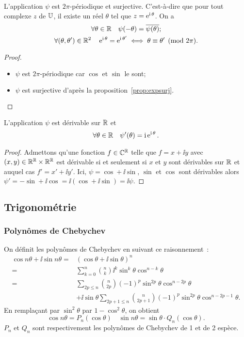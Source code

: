\begin{prop}
  L'application $\psi$ est  $2\pi$-périodique et surjective. C'est-à-dire que pour tout complexe $z$ de $\mathbb{U}$, il existe un réel $\theta$ tel que $z=\operatorname{e}^{\operatorname{i} \theta}$. On a
  \begin{gather}
    \forall \theta \in \mathbb{R} \quad \psi(-\theta)=\overline{\psi(\theta)};\\
    \forall (\theta, \theta') \in \mathbb{R}^2 \quad \operatorname{e}^{\operatorname{i} \theta}=\operatorname{e}^{\operatorname{i} \theta'} \iff \theta \equiv \theta' \pmod {2\pi}.
  \end{gather}
\end{prop}
\begin{proof}
  \begin{itemize}
  \item $\psi$ est $2\pi$-périodique car $\cos$ et $\sin$ le sont;
  \item $\psi$ est surjective d'après la proposition~\ref{prop:expsurj}.
  \end{itemize}
\end{proof}
%
\begin{prop}
  L'application $\psi$ est dérivable sur $\mathbb{R}$ et
  \begin{equation}
    \forall \theta \in \mathbb{R} \quad \psi'(\theta)=\operatorname{i} \operatorname{e}^{\operatorname{i} \theta}.
  \end{equation}
\end{prop}
\begin{proof}
  Admettons qu'une fonction $f \in \mathbb{C}^{\mathbb{R}}$ telle que $f=x+\ii y$ avec $(x,y) \in \mathbb{R}^{\mathbb{R}} \times \mathbb{R}^{\mathbb{R}}$ est dérivable si et seulement si $x$ et $y$ sont dérivables sur $\mathbb{R}$ et auquel cas $f'=x' +\ii y'$. Ici, $\psi=\cos +\ii \sin$, $\sin$ et $\cos$ sont dérivables alors $\psi'=-\sin + \ii \cos=\ii (\cos +\ii \sin)=\ii \psi$.
\end{proof}
%
\subsection{Trigonométrie}
\label{subsec:complexestrigo}
\subsubsection{Polynômes de Chebychev}
\label{subsubsec:Chebychev}
\begin{defdef}
  On définit les polynômes de Chebychev en suivant ce raisonnement~:
  \begin{align}
    \cos n \theta + \ii \sin n \theta =& (\cos \theta + \ii \sin \theta)^n\\
    =& \sum_{k=0}^n \binom{n}{k} \ii^k \sin^k \theta \cos^{n-k} \theta\\
    =& \sum_{2p \leq n} \binom{n}{2p} (-1)^p \sin^{2p} \theta \cos^{n-2p} \theta \\ &+ \ii \sin \theta \sum_{2p +1\leq n} \binom{n}{2p+1} (-1)^p \sin^{2p} \theta \cos^{n-2p-1} \theta.
  \end{align}
  En remplaçant par $\sin^2 \theta$ par $1-\cos^2 \theta$, on obtient
  \begin{equation}
    \cos n \theta = P_n(\cos \theta) \quad \sin n \theta = \sin \theta \cdot Q_n(\cos \theta).
  \end{equation}
  $P_n$ et $Q_n$ sont respectivement les polynômes de Chebychev de 1\iere{} et de 2\ieme{} espèce.
\end{defdef}
%
